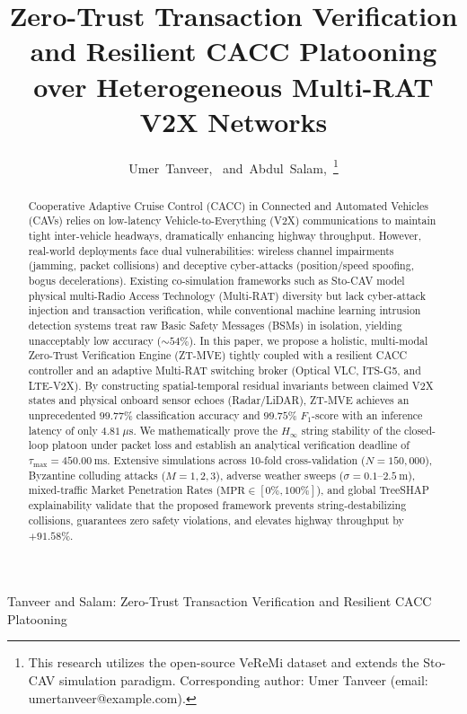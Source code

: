 \documentclass[journal]{IEEEtran}
\begin{document}
\title{Zero-Trust Transaction Verification and Resilient CACC Platooning over Heterogeneous Multi-RAT V2X Networks}

\author{Umer~Tanveer,~
        and~Abdul~Salam,~\thanks{This research utilizes the open-source VeReMi dataset and extends the Sto-CAV simulation paradigm. Corresponding author: Umer Tanveer (email: umertanveer@example.com).}}

%
{Tanveer and Salam: Zero-Trust Transaction Verification and Resilient CACC Platooning}

\maketitle

\begin{abstract}
Cooperative Adaptive Cruise Control (CACC) in Connected and Automated Vehicles (CAVs) relies on low-latency Vehicle-to-Everything (V2X) communications to maintain tight inter-vehicle headways, dramatically enhancing highway throughput. However, real-world deployments face dual vulnerabilities: wireless channel impairments (jamming, packet collisions) and deceptive cyber-attacks (position/speed spoofing, bogus decelerations). Existing co-simulation frameworks such as Sto-CAV model physical multi-Radio Access Technology (Multi-RAT) diversity but lack cyber-attack injection and transaction verification, while conventional machine learning intrusion detection systems treat raw Basic Safety Messages (BSMs) in isolation, yielding unacceptably low accuracy ($\sim 54\%$). In this paper, we propose a holistic, multi-modal Zero-Trust Verification Engine (ZT-MVE) tightly coupled with a resilient CACC controller and an adaptive Multi-RAT switching broker (Optical VLC, ITS-G5, and LTE-V2X). By constructing spatial-temporal residual invariants between claimed V2X states and physical onboard sensor echoes (Radar/LiDAR), ZT-MVE achieves an unprecedented $99.77\%$ classification accuracy and $99.75\%$ $F_1$-score with an inference latency of only $4.81~\mu\text{s}$. We mathematically prove the $H_\infty$ string stability of the closed-loop platoon under packet loss and establish an analytical verification deadline of $\tau_{\max} = 450.00~\text{ms}$. Extensive simulations across 10-fold cross-validation ($N=150,000$), Byzantine colluding attacks ($M=1,2,3$), adverse weather sweeps ($\sigma=0.1\text{--}2.5~\text{m}$), mixed-traffic Market Penetration Rates ($\text{MPR} \in [0\%, 100\%]$), and global TreeSHAP explainability validate that the proposed framework prevents string-destabilizing collisions, guarantees zero safety violations, and elevates highway throughput by $+91.58\%$.
\end{abstract}
\end{document}
